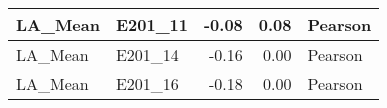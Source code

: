 \begin{table}[ht]
\centering
\begin{tabular}{llrrl}
   \hline
LA_Mean & E201_11 & -0.08 & 0.08 & Pearson \\ 
   \hline
LA_Mean & E201_14 & -0.16 & 0.00 & Pearson \\ 
  LA_Mean & E201_16 & -0.18 & 0.00 & Pearson \\ 
  \end{tabular}
\end{table}
